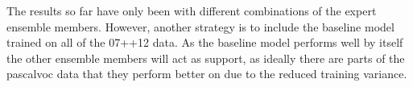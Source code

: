 The results so far have only been with different combinations of the expert ensemble members. However, another strategy is to include the baseline model trained on all of the 07++12 data. As the baseline model performs well by itself the other ensemble members will act as support, as ideally there are parts of the \gls{pascalvoc} data that they perform better on due to the reduced training variance.




